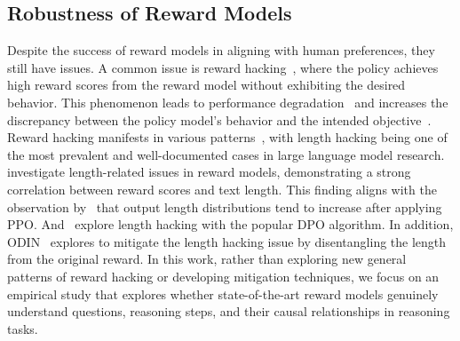 \subsection{Robustness of Reward Models}
Despite the success of reward models in aligning with human preferences, they still have issues. A common issue is reward hacking~\citep{ibarz2018reward, denison2024sycophancy}, where the policy achieves high reward scores from the reward model without exhibiting the desired behavior. This phenomenon leads to performance degradation~\citep{bai2022training} and increases the discrepancy between the policy model's behavior and the intended objective~\citep{stienon2020learning}. 
Reward hacking manifests in various patterns~\citep{park2024offsetbias}, with length hacking being one of the most prevalent and well-documented cases in large language model research.~\citet{singhal2024long} investigate length-related issues in reward models, demonstrating a strong correlation between reward scores and text length. This finding aligns with the observation by~\citet{dubois2023alpacafarm} that output length distributions tend to increase after applying PPO. And~\citet{liu2024iterative} explore length hacking with the popular DPO algorithm. In addition, ODIN~\citep{denison2024sycophancy} explores to mitigate the length hacking issue by disentangling the length from the original reward.
In this work, rather than exploring new general patterns of reward hacking or developing mitigation techniques, we focus on an empirical study that explores whether state-of-the-art reward models genuinely understand questions, reasoning steps, and their causal relationships in reasoning tasks.